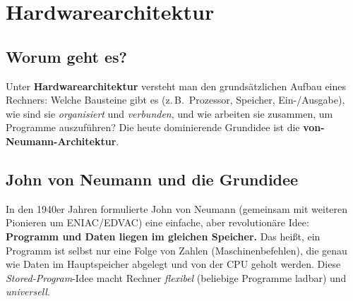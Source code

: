 \documentclass[../skript/main.tex]{subfiles}
\begin{document}
\label{chap:hardwarearchitektur}
\chapter{Hardwarearchitektur}

\section{Worum geht es?}
Unter \textbf{Hardwarearchitektur} versteht man den grundsätzlichen Aufbau eines Rechners:
Welche Bausteine gibt es (z.\,B.\ Prozessor, Speicher, Ein-/Ausgabe), wie sind sie
\emph{organisiert} und \emph{verbunden}, und wie arbeiten sie zusammen, um Programme auszuführen?
Die heute dominierende Grundidee ist die \textbf{von-Neumann-Architektur}.

\section{John von Neumann und die Grundidee}
In den 1940er Jahren formulierte John von Neumann (gemeinsam mit weiteren Pionieren um ENIAC/EDVAC)
eine einfache, aber revolutionäre Idee: \textbf{Programm und Daten liegen im gleichen Speicher.}
Das heißt, ein Programm ist selbst nur eine Folge von Zahlen (Maschinenbefehlen), die genau wie Daten
im Hauptspeicher abgelegt und von der CPU geholt werden. Diese \emph{Stored-Program}-Idee macht
Rechner \emph{flexibel} (beliebige Programme ladbar) und \emph{universell}.



\end{document}
